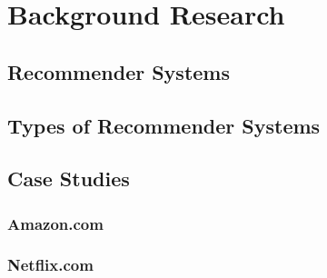 \chapter{Background Research}

\section{Recommender Systems}
\section{Types of Recommender Systems}
\section{Case Studies}
\subsection{Amazon.com}
\subsection{Netflix.com}